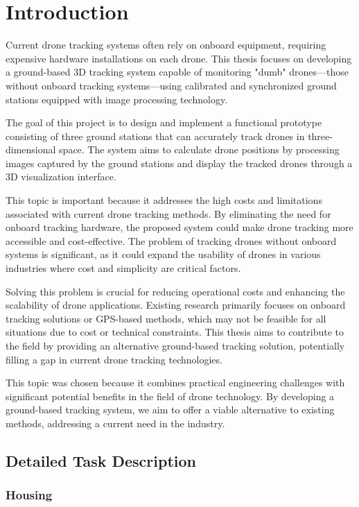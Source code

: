 \chapter{Introduction}

Current drone tracking systems often rely on onboard equipment, requiring expensive hardware installations on each drone. This thesis focuses on developing a ground-based 3D tracking system capable of monitoring "dumb" drones—those without onboard tracking systems—using calibrated and synchronized ground stations equipped with image processing technology.

The goal of this project is to design and implement a functional prototype consisting of three ground stations that can accurately track drones in three-dimensional space. The system aims to calculate drone positions by processing images captured by the ground stations and display the tracked drones through a 3D visualization interface.

This topic is important because it addresses the high costs and limitations associated with current drone tracking methods. By eliminating the need for onboard tracking hardware, the proposed system could make drone tracking more accessible and cost-effective. The problem of tracking drones without onboard systems is significant, as it could expand the usability of drones in various industries where cost and simplicity are critical factors.

Solving this problem is crucial for reducing operational costs and enhancing the scalability of drone applications. Existing research primarily focuses on onboard tracking solutions or GPS-based methods, which may not be feasible for all situations due to cost or technical constraints. This thesis aims to contribute to the field by providing an alternative ground-based tracking solution, potentially filling a gap in current drone tracking technologies.

This topic was chosen because it combines practical engineering challenges with significant potential benefits in the field of drone technology. By developing a ground-based tracking system, we aim to offer a viable alternative to existing methods, addressing a current need in the industry.

\section{Detailed Task Description}

\subsection{Housing}


